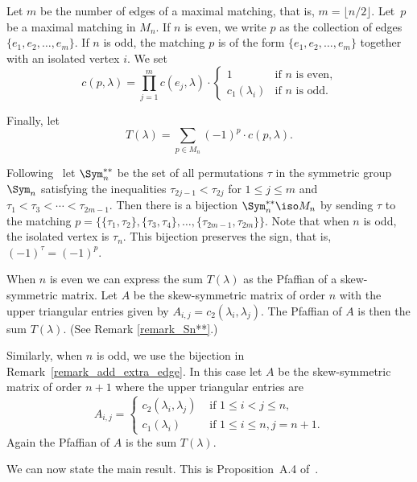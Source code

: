 Let $m$ be the number of edges of a maximal matching,
that is, $m = \lfloor n/2 \rfloor$.
Let~$p$ be a maximal matching in $M_{n}$.
If $n$ is even, we write $p$ as the collection of
edges~$\{e_{1}, e_{2}, \ldots, e_{m}\}$.
If $n$ is odd, the matching $p$
is of the form
$\{e_{1}, e_{2}, \ldots, e_{m}\}$
together with an isolated vertex $i$.
We set
$$
c(p,\lambda)=\prod_{j=1}^{m} c(e_{j},\lambda) 
\cdot
\begin{cases}
1 & \text{if $n$ is even,} \\
c_{1}(\lambda_{i}) & \text{if $n$ is odd.}
\end{cases}
$$



Finally, let
\begin{equation}
     T(\lambda)=\sum_{p\in M_{n}} (-1)^{p} \cdot c(p,\lambda) . 
\label{equation_T_lambda}
\end{equation}


\begin{remark}
{\rm
Following~\cite{Herb}
let $\Sym_{n}^{**}$
be the set of all permutations $\tau$
in the symmetric group $\Sym_{n}$
satisfying the inequalities
$\tau_{2j-1} < \tau_{2j}$ for
$1 \leq j \leq m$
and
$\tau_{1} < \tau_{3} < \cdots < \tau_{2m-1}$.
Then there is a bijection
$\Sym_{n}^{**} \iso M_{n}$
by sending $\tau$ to the matching
$p=\{\{\tau_{1},\tau_{2}\}, \{\tau_{3},\tau_{4}\},\ldots,
\{\tau_{2m-1},\tau_{2m}\}\}$.
Note that when $n$ is odd, the isolated vertex is $\tau_{n}$.
This bijection preserves the sign, that is,
$(-1)^{\tau} = (-1)^{p}$. 
}
\label{remark_Sn**}
\end{remark}


\begin{remark}
{\rm
When $n$ is even we can express the
sum $T(\lambda)$ as the Pfaffian of a skew-symmetric matrix.
Let $A$ be the skew-symmetric matrix of order $n$
with the upper triangular entries given by
$A_{i,j}=c_2(\lambda_{i},\lambda_{j})$.
The Pfaffian of $A$ is then the sum $T(\lambda)$. (See Remark \ref{remark_Sn**}.)

Similarly, when $n$ is odd, we use the bijection in
Remark~\ref{remark_add_extra_edge}.
In this case let $A$ be the skew-symmetric
matrix of order $n+1$ where
the upper triangular entries are 
$$ A_{i,j}
=
\begin{cases}
c_{2}(\lambda_{i},\lambda_{j})
& \text{ if } 1 \leq i < j \leq n , \\
c_{1}(\lambda_{i})
& \text{ if } 1 \leq i \leq n, j=n+1 .
\end{cases}
$$
Again the Pfaffian of $A$ is the sum $T(\lambda)$.
}
\end{remark}

We can now state the main result.
This
is Proposition~A.4 of~\cite{Morel}.
